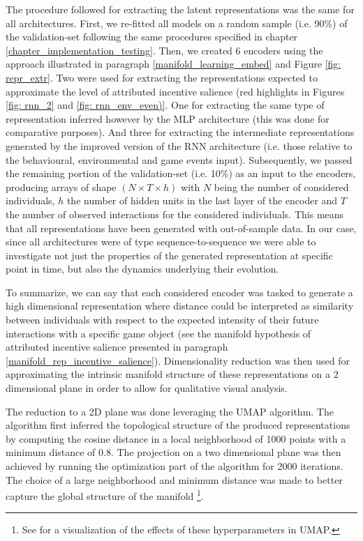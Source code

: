 The procedure followed for extracting the latent representations was the same for all architectures. First, we re-fitted all models on a random sample (i.e. 90\%) of the validation-set following the same procedures specified in chapter \ref{chapter_implementation_testing}. Then, we created 6 encoders using the approach illustrated in paragraph \ref{manifold_learning_embed} and Figure \ref{fig: repr_extr}. Two were used for extracting the representations expected to approximate the level of attributed incentive salience (red highlights in Figures \ref{fig: rnn_2} and \ref{fig: rnn_env_even)}. One for extracting the same type of representation inferred however by the MLP architecture (this was done for comparative purposes). And  three for extracting the intermediate representations generated by the improved version of the RNN architecture (i.e. those relative to the behavioural, environmental and game events input). Subsequently, we passed the remaining portion of the validation-set (i.e. 10\%) as an input to the encoders, producing arrays of shape $(N \times T \times h)$ with $N$ being the number of considered individuals, $h$ the number of hidden units in the last layer of the encoder and $T$ the number of observed interactions for the considered individuals. This means that all representations have been generated with out-of-sample data. In our case, since all architectures were of type sequence-to-sequence we were able to investigate not just the properties of the generated representation at specific point in time, but also the dynamics underlying their evolution. 

To summarize, we can say that each considered encoder was tasked to generate a high dimensional representation where distance could be interpreted as similarity between individuals with respect to the expected intensity of their future interactions with a specific game object (see the manifold hypothesis of attributed incentive salience presented in paragraph \ref{manifold_rep_incentive_salience}). Dimensionality reduction was then used for approximating the intrinsic manifold structure of these representations on a 2 dimensional plane in order to allow for qualitative visual analysis. 

The reduction to a 2D plane was done leveraging the UMAP algorithm. The algorithm first inferred the topological structure of the produced representations by computing the cosine distance in a local neighborhood of 1000 points with a minimum distance of 0.8. The projection on a two dimensional plane was then achieved by running the optimization part of the algorithm for 2000 iterations. The choice of a large neighborhood and minimum distance was made to better capture the global structure of the manifold \footnote{See \cite{umapwebs} for a visualization of the effects of these hyperparameters in UMAP.}. 


